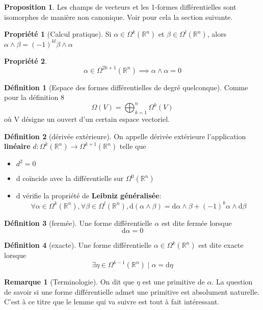 \documentclass{article}
\newcommand{\R}{\mathbb{R}} %
\theoremstyle{definition} %
\newtheorem{defi}{Définition}
\newtheorem{rmq}{Remarque}
\newtheorem{prop}{Proposition}
\newtheorem{propri}{Propriété}
\newcommand{\OM}[1]{\Omega^{#1} (\R^n)}
\newcommand{\dd}{ \mathrm{d}}
\newcommand{\1}{\mathbb{1}} %
\begin{document}
\begin{prop}
Les champs de vecteurs et les 1-formes différentielles sont isomorphes de manière non canonique. Voir pour cela la section suivante.
\end{prop}
\begin{propri}[Calcul pratique]
Si $\alpha \in \Omega^k(\R^n) $ et $ \beta \in \Omega^l(\R^n)$, alors $ \alpha \wedge \beta = (-1)^{kl} \beta \wedge \alpha $
\end{propri}

\begin{propri}
$$ \alpha \in \OM{2k+1} \implies \alpha \wedge \alpha =0$$
\end{propri}

\begin{defi}[Espace des formes différentielles de degré quelconque]
Comme pour la définition 8
$$\Omega(V)=\bigoplus_{k=1}^{n} \Omega^k (V)$$
où V désigne un ouvert d'un certain espace vectoriel.
\end{defi}

\begin{defi}[dérivée extérieure]
On appelle dérivée extérieure l'application \textbf{linéaire} $d : \OM{k} \to \OM{k+1}$ telle que
\begin{itemize}
\item $d^2=0$
\item d coïncide avec la différentielle sur $\OM{0}$
\item d vérifie la propriété de \textbf{Leibniz généralisée}:
$$\forall \alpha \in \OM{k}, \forall \beta \in \OM{l}, \dd (\alpha \wedge \beta) = \dd \alpha \wedge \beta + (-1)^k \alpha \wedge \dd \beta$$
\end{itemize}
\end{defi}

\begin{defi}[fermée]
Une forme différentielle $\alpha$ est dite fermée lorsque 
$$\dd \alpha = 0$$
\end{defi}

\begin{defi}[exacte]
Une forme différentielle $\alpha \in \OM{k}$ est dite exacte lorsque 
$$\exists \eta \in \OM{k-1} \mid \alpha = \dd \eta$$
\end{defi}
\begin{rmq}[Terminologie]
On dit que $\eta $ est une primitive de $\alpha$. La question de savoir si une forme différentielle admet une primitive est absolument naturelle. C'est à ce titre que le lemme qui va suivre est tout à fait intéressant.
\end{rmq}
\end{document}
